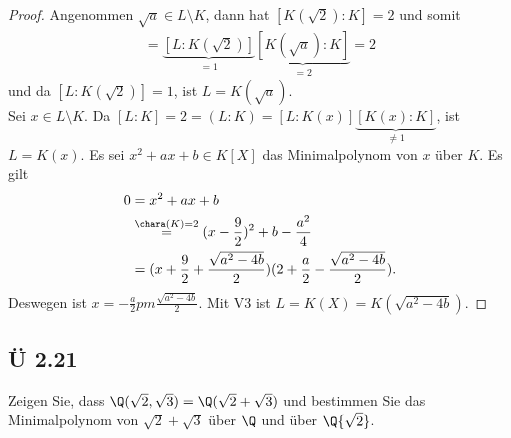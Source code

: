 \begin{proof}
	Angenommen $\sqrt{a} \in L \setminus K$, dann hat $[K(\sqrt{2}):K] =2$ und somit 
	\begin{align*}
		[L:K] = \underbrace{[L:K(\sqrt{2})]}_{=1}\underbrace{[K(\sqrt{a}):K]}_{=2} = 2
	\end{align*}
	und da $[L:K(\sqrt{2})] = 1$, ist $L=K(\sqrt{a})$.\\
	Sei $x \in L\setminus K$. Da $[L:K] = 2 = (L:K) = [L:K(x)]\underbrace{[K(x):K]}_{\neq 1}$, ist $L=K(x)$. Es sei
	$x^2 + ax + b \in K[X]$ das Minimalpolynom von $x$ über $K$. Es gilt
	\begin{align*}
		0&=x^2 + ax + b\\
		&\overset{\chara(K) =2}{=} (x-\frac{9}{2})^2 + b - \frac{a^2}{4}\\
		&= (x + \frac{9}{2} + \frac{\sqrt{a^2 - 4b}}{2})(2 + \frac{a}{2} - \frac{\sqrt{a^2 - 4b}}{2}).
	\end{align*}
	Deswegen ist $x  = - \frac{a}{2} pm \frac{\sqrt{a^2 - 4b}}{2}$. Mit V3 ist $L = K(X) = K(\sqrt{a^2-4b})$.
\end{proof}

\subsection{Ü 2.21}
Zeigen Sie, dass $\Q(\sqrt{2}, \sqrt{3}) = \Q(\sqrt{2}+\sqrt{3})$ und bestimmen Sie das Minimalpolynom von $\sqrt{2} + \sqrt{3}$ über $\Q$ und über $\Q{\sqrt{2}}$.

